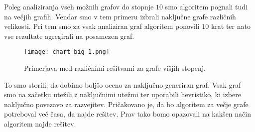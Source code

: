 \documentclass[12pt,a4paper,twoside]{article}
\theoremstyle{definition} %
\theoremstyle{plain} %
\numberwithin{equation}{section}  %
\begin{document}
Poleg analiziranja vseh možnih grafov do stopnje $10$ smo algoritem pognali tudi na večjih grafih. Vendar smo v tem primeru izbrali naključne grafe različnih velikosti. Pri tem smo za vsak analiziran graf algoritem ponovili $10$ krat ter nato vse rezultate agregirali na posamezen graf.
 \begin{figure}[h!]
\caption{Primerjava med različnimi rešitvami za grafe višjih stopenj.}
\label{chart_big_1}
\centering
    \texttt{[image: chart\_big\_1.png]}
    \end{figure}
To smo storili, da dobimo boljšo oceno za naključno generiran graf. Vsak graf smo na začetku utežili z naključnimi utežmi ter uporabili hevristiko, ki izbere naključno povezavo za razvejitev. Pričakovano je, da bo algoritem za večje grafe potreboval več časa, da najde rešitev. Prav tako bomo opazovali na kakšen način algoritem najde rešitev. 
\end{document}
